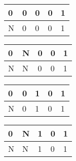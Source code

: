 \qquad\begin{tabular}{ | l | l | l | l | l |}
\hline
0 & 0 & 0 & 0 & 1 \\
\hline
N & 0 & 0 & 0 & 1 \\
\hline
\end{tabular}
\qquad\begin{tabular}{ | l | l | l | l | l |}
\hline
0 & N & 0 & 0 & 1 \\
\hline
N & N & 0 & 0 & 1 \\
\hline
\end{tabular}
\qquad\begin{tabular}{ | l | l | l | l | l |}
\hline
0 & 0 & 1 & 0 & 1 \\
\hline
N & 0 & 1 & 0 & 1 \\
\hline
\end{tabular}
\qquad\begin{tabular}{ | l | l | l | l | l |}
\hline
0 & N & 1 & 0 & 1 \\
\hline
N & N & 1 & 0 & 1 \\
\hline
\end{tabular}

\EndNoBibArticle
